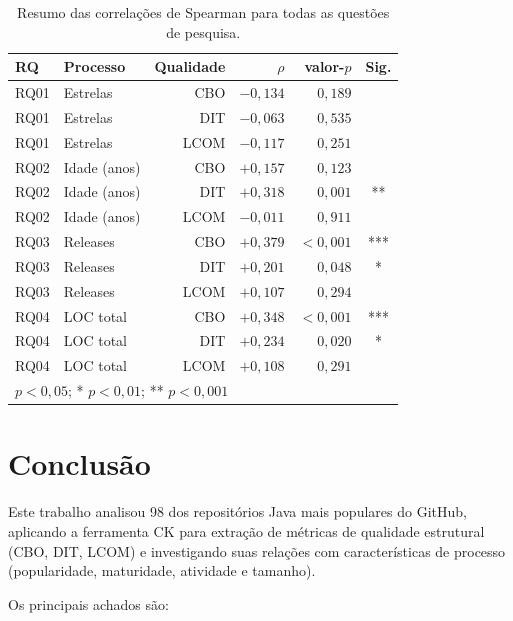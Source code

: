 \documentclass[12pt,a4paper]{article}
\begin{document}
\begin{table}[htbp]
\centering
\caption{Resumo das correlações de Spearman para todas as questões de pesquisa.}
\label{tab:resumo}
\small
\begin{tabular}{llrrrc}
\toprule
\textbf{RQ} & \textbf{Processo} & \textbf{Qualidade} & \textbf{$\rho$} & \textbf{valor-$p$} & \textbf{Sig.} \\
\midrule
RQ01 & Estrelas & CBO  & $-0{,}134$ & $0{,}189$ & \\
RQ01 & Estrelas & DIT  & $-0{,}063$ & $0{,}535$ & \\
RQ01 & Estrelas & LCOM & $-0{,}117$ & $0{,}251$ & \\
\midrule
RQ02 & Idade (anos) & CBO  & $+0{,}157$ & $0{,}123$ & \\
RQ02 & Idade (anos) & DIT  & $+0{,}318$ & $0{,}001$ & ** \\
RQ02 & Idade (anos) & LCOM & $-0{,}011$ & $0{,}911$ & \\
\midrule
RQ03 & Releases & CBO  & $+0{,}379$ & $< 0{,}001$ & *** \\
RQ03 & Releases & DIT  & $+0{,}201$ & $0{,}048$   & * \\
RQ03 & Releases & LCOM & $+0{,}107$ & $0{,}294$   & \\
\midrule
RQ04 & LOC total & CBO  & $+0{,}348$ & $< 0{,}001$ & *** \\
RQ04 & LOC total & DIT  & $+0{,}234$ & $0{,}020$   & * \\
RQ04 & LOC total & LCOM & $+0{,}108$ & $0{,}291$   & \\
\bottomrule
\multicolumn{6}{l}{\small * $p < 0{,}05$; \quad ** $p < 0{,}01$; \quad *** $p < 0{,}001$}
\end{tabular}
\end{table}

\section{Conclusão}

Este trabalho analisou 98 dos repositórios Java mais populares do GitHub,
aplicando a ferramenta CK para extração de métricas de qualidade estrutural
(CBO, DIT, LCOM) e investigando suas relações com características de processo
(popularidade, maturidade, atividade e tamanho).

Os principais achados são:
\end{document}
